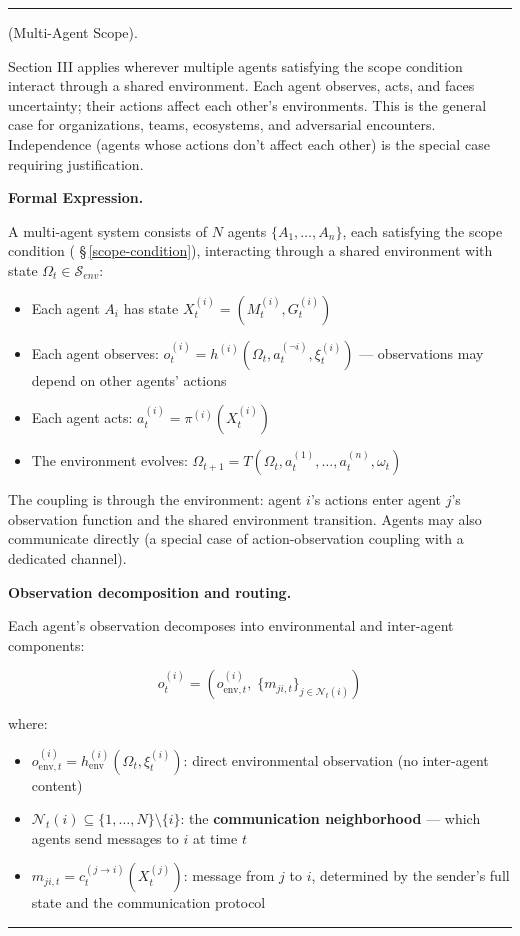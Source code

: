 \documentclass[11pt,oneside]{article}
\newcounter{claim}[section]
\renewcommand{\theclaim}{\thesection.\arabic{claim}}
\newenvironment{segment}[2]{%
  \refstepcounter{claim}%
  \bigskip\noindent\hrule\smallskip
  \noindent{\bfseries #1~\theclaim}\enskip(#2).\par\smallskip
  \noindent\ignorespaces
}{%
  \par\smallskip\noindent\hrule\bigskip
}
\newenvironment{scope}[1][]{\begin{segment}{Scope}{#1}}{\end{segment}}
\begin{document}
\begin{scope}[Multi-Agent Scope]
\label{multi-agent-scope}
Section III applies wherever multiple agents satisfying the scope condition interact through a shared environment. Each agent observes, acts, and faces uncertainty; their actions affect each other's environments. This is the general case for organizations, teams, ecosystems, and adversarial encounters. Independence (agents whose actions don't affect each other) is the special case requiring justification.



\medskip\noindent\textbf{Formal Expression.}



A multi-agent system consists of $N$ agents $\{A_1, \ldots, A_n\}$, each satisfying the scope condition ( \S\,\ref{scope-condition}), interacting through a shared environment with state $\Omega_t \in \mathcal{S}_{env}$:

\begin{itemize}
  \item Each agent $A_i$ has state $X_t^{(i)} = (M_t^{(i)}, G_t^{(i)})$
  \item Each agent observes: $o_t^{(i)} = h^{(i)}(\Omega_t, a_t^{(\neg i)}, \xi_t^{(i)})$ — observations may depend on other agents' actions
  \item Each agent acts: $a_t^{(i)} = \pi^{(i)}(X_t^{(i)})$
  \item The environment evolves: $\Omega_{t+1} = T(\Omega_t, a_t^{(1)}, \ldots, a_t^{(n)}, \omega_t)$
\end{itemize}


The coupling is through the environment: agent $i$'s actions enter agent $j$'s observation function and the shared environment transition. Agents may also communicate directly (a special case of action-observation coupling with a dedicated channel).


\medskip\noindent\textbf{Observation decomposition and routing.}



Each agent's observation decomposes into environmental and inter-agent components:

$$o_t^{(i)} = \left(o_{\text{env},t}^{(i)},\; \{m_{ji,t}\}_{j \in \mathcal N_t(i)}\right)$$

where:
\begin{itemize}
  \item $o_{\text{env},t}^{(i)} = h_\text{env}^{(i)}(\Omega_t, \xi_t^{(i)})$: direct environmental observation (no inter-agent content)
  \item $\mathcal N_t(i) \subseteq \{1, \ldots, N\} \setminus \{i\}$: the \textbf{communication neighborhood} — which agents send messages to $i$ at time $t$
  \item $m_{ji,t} = c_t^{(j \to i)}(X_t^{(j)})$: message from $j$ to $i$, determined by the sender's full state and the communication protocol
\end{itemize}




\end{scope}
\end{document}
